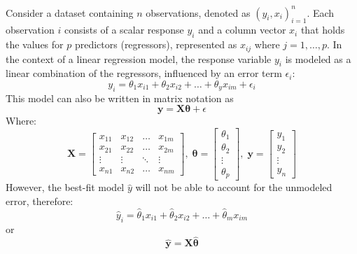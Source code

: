 \documentclass[12pt,letter]{article}
\begin{document}
Consider a dataset containing $n$ observations, denoted as $(y_i, x_i)^n_{i=1}$. Each observation $i$ consists of a scalar response $y_i$ and a column vector $x_i$ that holds the values for $p$ predictors (regressors), represented as $x_{ij}$ where $j = 1, \dots, p$. In the context of a linear regression model, the response variable $y_i$ is modeled as a linear combination of the regressors, influenced by an error term $\epsilon_i$:
\begin{equation}
 y_i = \theta_1x_{i1}+\theta_2x_{i2}+\hdots+\theta_yx_{im}+\epsilon_i 
\end{equation}
This model can also be written in matrix notation as
\begin{equation}
\textbf{y} = \textbf{X} \pmb{\theta} + \epsilon
\end{equation}
Where: 
\begin{equation}
	\textbf{X} = \begin{bmatrix}
	x_{11} & x_{12} & \hdots & x_{1m} \\
	x_{21} & x_{22} & \hdots & x_{2m} \\
	\vdots & \vdots & \ddots & \vdots \\
	x_{n1} & x_{n2} & \hdots & x_{nm}
	\end{bmatrix},\;
	\pmb{\theta} = \begin{bmatrix}
	\theta_1 \\
	\theta_2 \\
	\vdots \\
	\theta_p
	\end{bmatrix},\;
	\textbf{y}=\begin{bmatrix}
	y_1 \\
	y_2 \\
	\vdots \\
	y_n
	\end{bmatrix}
\end{equation}
However, the best-fit model $\hat{y}$ will not be able to account for the unmodeled error, therefore: 
\begin{equation}
 \hat{y}_i = \hat{\theta}_1x_{i1}+\hat{\theta}_2x_{i2}+\hdots+\hat{\theta}_m x_{im}
\end{equation}
or 
\begin{equation}
 \hat{\textbf{y}} = \textbf{X} \hat{\pmb{\theta}}
\end{equation}
\end{document}

